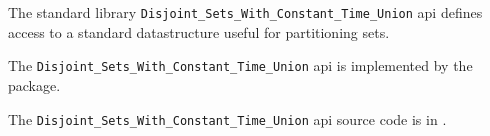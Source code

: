 
The standard library {\tt Disjoint\_Sets\_With\_Constant\_Time\_Union} api defines access to a standard 
datastructure useful for partitioning sets.

The {\tt Disjoint\_Sets\_With\_Constant\_Time\_Union} api is implemented by the  package.

The {\tt Disjoint\_Sets\_With\_Constant\_Time\_Union} api source code is in .
